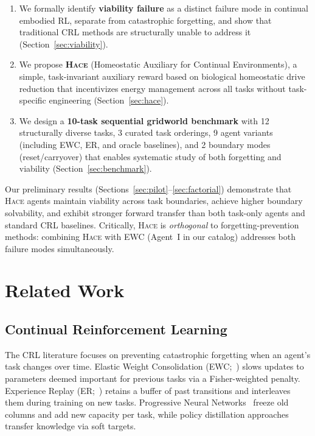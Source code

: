 \documentclass{article}
\newcommand{\hace}{\textsc{Hace}}
\begin{document}
\begin{enumerate}[leftmargin=*,topsep=2pt,itemsep=1pt]
  \item We formally identify \textbf{viability failure} as a distinct failure
        mode in continual embodied RL, separate from catastrophic forgetting,
        and show that traditional CRL methods are structurally unable to
        address it (Section~\ref{sec:viability}).

  \item We propose \textbf{\hace{}} (Homeostatic Auxiliary for Continual
        Environments), a simple, task-invariant auxiliary reward based on
        biological homeostatic drive reduction that incentivizes energy
        management across all tasks without task-specific
        engineering (Section~\ref{sec:hace}).

  \item We design a \textbf{10-task sequential gridworld benchmark} with
        12 structurally diverse tasks, 3 curated task orderings, 9 agent
        variants (including EWC, ER, and oracle baselines), and 2
        boundary modes (reset/carryover) that enables systematic study of
        both forgetting and viability (Section~\ref{sec:benchmark}).
\end{enumerate}

Our preliminary results (Sections~\ref{sec:pilot}--\ref{sec:factorial})
demonstrate that \hace{} agents maintain viability across task boundaries,
achieve higher boundary solvability, and exhibit stronger forward transfer
than both task-only agents and standard CRL baselines. Critically, \hace{}
is \emph{orthogonal} to forgetting-prevention methods: combining \hace{}
with EWC (Agent~I in our catalog) addresses both failure modes
simultaneously.

\section{Related Work}
\label{sec:related}

\subsection{Continual Reinforcement Learning}

The CRL literature focuses on preventing catastrophic forgetting when an
agent's task changes over time. Elastic Weight Consolidation
(EWC;~\citep{kirkpatrick2017}) slows updates to parameters deemed important
for previous tasks via a Fisher-weighted penalty. Experience Replay
(ER;~\citep{rolnick2019}) retains a buffer of past transitions and
interleaves them during training on new tasks. Progressive Neural
Networks~\citep{rusu2016} freeze old columns and add new capacity per task,
while policy distillation approaches~\citep{rusu2015} transfer knowledge
via soft targets.
\end{document}
